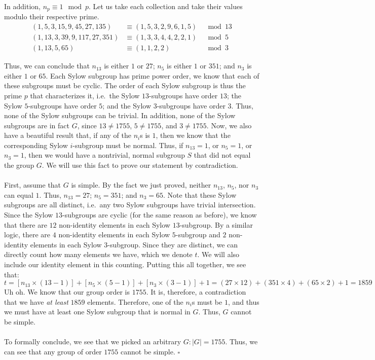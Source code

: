 \documentclass[letterpaper]{article}
\newcommand*{\QED}{\hfill\ensuremath{\square}}%
\begin{document}
In addition, $ n_p \equiv 1 \mod{p} $.
Let us take each collection and take their values modulo their respective prime.
\begin{align}
    (1, 5, 3, 15, 9, 45, 27, 135) &\equiv (1, 5, 3, 2, 9, 6, 1, 5) &\mod{13}  \\
    (1, 13, 3, 39, 9, 117, 27, 351) &\equiv (1, 3, 3, 4, 4, 2, 2, 1) &\mod{5} \\
    (1, 13, 5, 65) &\equiv (1, 1, 2, 2) &\mod{3}
\end{align}

Thus, we can conclude that $ n_{13} $ is either $ 1 $ or $ 27 $; $ n_{5} $ is either $ 1 $ or $ 351 $; and $ n_3 $ is either $ 1 $ or $ 65 $.
Each Sylow subgroup has prime power order, we know that each of these subgroups must be cyclic.
The order of each Sylow subgroup is thus the prime $ p $ that characterizes it, i.e.\ the Sylow $ 13 $-subgroups have order $ 13 $; the Sylow $ 5 $-subgroups have order $ 5 $; and the Sylow $ 3 $-subgroups have order $ 3 $.
Thus, none of the Sylow subgroups can be trivial.
In addition, none of the Sylow subgroups are in fact $ G $, since $ 13 \neq 1755 $, $ 5 \neq 1755 $, and $ 3 \neq 1755 $.
Now, we also have a beautiful result that, if any of the $ n_i $s is $ 1 $, then we know that the corresponding Sylow $ i $-subgroup must be normal.
Thus, if $ n_{13} = 1 $, or $ n_{5} = 1 $, or $ n_{3} = 1 $, then we would have a nontrivial, normal subgroup $ S $ that did not equal the group $ G $.
We will use this fact to prove our statement by contradiction.
\\ \\
First, assume that $ G $ is simple.
By the fact we just proved, neither $ n_{13} $, $ n_5 $, nor $ n_3 $ can equal $ 1 $.
Thus, $ n_{13} = 27 $; $ n_5 = 351 $; and $ n_3 = 65 $.
Note that these Sylow subgroups are all distinct, i.e.\ any two Sylow subgroups have trivial intersection.
Since the Sylow $ 13 $-subgroups are cyclic (for the same reason as before), we know that there are $ 12 $ non-identity elements in each Sylow $ 13 $-subgroup.
By a similar logic, there are $ 4 $ non-identity elements in each Sylow $ 5 $-subgroup and $ 2 $ non-identity elements in each Sylow $ 3 $-subgroup.
Since they are distinct, we can directly count how many elements we have, which we denote $ t $.
We will also include our identity element in this counting.
Putting this all together, we see that:
\[
t = \left[n_{13} \times (13 - 1) \right] + \left[n_{5} \times (5 - 1) \right] + \left[n_{3} \times (3 - 1) \right] + 1 = (27 \times 12) + (351 \times 4) + (65 \times 2) + 1 = 1859
\]
Uh oh.
We know that our group order is $ 1755 $.
It is, therefore, a contradiction that we have \textit{at least} $ 1859 $ elements.
Therefore, one of the $ n_i $s must be $ 1 $, and thus we must have at least one Sylow subgroup that is normal in $ G $.
Thus, $ G $ cannot be simple.
\\ \\
To formally conclude, we see that we picked an arbitrary $ G : |G| = 1755 $.
Thus, we can see that any group of order $ 1755 $ cannot be simple.
\QED{}
\end{document}
